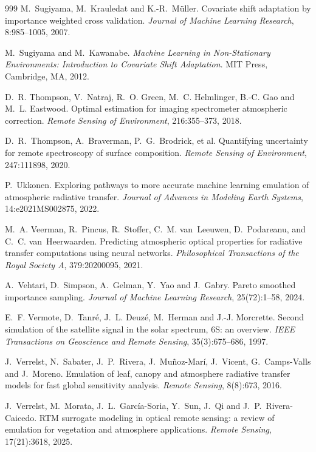 \begin{thebibliography}{999}
M.~Sugiyama, M.~Krauledat and K.-R.~M\"uller.
\newblock Covariate shift adaptation by importance weighted cross validation.
\newblock \emph{Journal of Machine Learning Research}, 8:985--1005, 2007.

M.~Sugiyama and M.~Kawanabe.
\newblock \emph{Machine Learning in Non-Stationary Environments: Introduction to Covariate Shift Adaptation}.
\newblock MIT Press, Cambridge, MA, 2012.

D.~R. Thompson, V.~Natraj, R.~O. Green, M.~C. Helmlinger, B.-C. Gao and M.~L. Eastwood.
\newblock Optimal estimation for imaging spectrometer atmospheric correction.
\newblock \emph{Remote Sensing of Environment}, 216:355--373, 2018.

D.~R.~Thompson, A.~Braverman, P.~G.~Brodrick, et al.
\newblock Quantifying uncertainty for remote spectroscopy of surface composition.
\newblock \emph{Remote Sensing of Environment}, 247:111898, 2020.

P.~Ukkonen.
\newblock Exploring pathways to more accurate machine learning emulation of atmospheric
radiative transfer.
\newblock \emph{Journal of Advances in Modeling Earth Systems}, 14:e2021MS002875, 2022.

M.~A. Veerman, R.~Pincus, R.~Stoffer, C.~M. van~Leeuwen, D.~Podareanu, and
C.~C. van~Heerwaarden.
\newblock Predicting atmospheric optical properties for radiative transfer computations using
neural networks.
\newblock \emph{Philosophical Transactions of the Royal Society A}, 379:20200095, 2021.

A.~Vehtari, D.~Simpson, A.~Gelman, Y.~Yao and J.~Gabry.
\newblock Pareto smoothed importance sampling.
\newblock \emph{Journal of Machine Learning Research}, 25(72):1--58, 2024.

E.~F. Vermote, D.~Tanr\'e, J.~L. Deuz\'e, M.~Herman and J.-J. Morcrette.
\newblock Second simulation of the satellite signal in the solar spectrum, 6S: an overview.
\newblock \emph{IEEE Transactions on Geoscience and Remote Sensing}, 35(3):675--686, 1997.

J.~Verrelst, N.~Sabater, J.~P.~Rivera, J.~Mu\~noz-Mar\'i, J.~Vicent, G.~Camps-Valls and J.~Moreno.
\newblock Emulation of leaf, canopy and atmosphere radiative transfer models for fast global sensitivity analysis.
\newblock \emph{Remote Sensing}, 8(8):673, 2016.

J.~Verrelst, M.~Morata, J.~L.~Garc\'ia-Soria, Y.~Sun, J.~Qi and J.~P.~Rivera-Caicedo.
\newblock RTM surrogate modeling in optical remote sensing: a review of emulation for vegetation and atmosphere applications.
\newblock \emph{Remote Sensing}, 17(21):3618, 2025.


\end{thebibliography}

